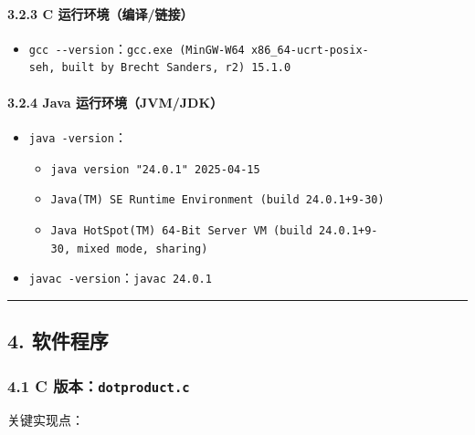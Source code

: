 \documentclass[12pt,fontset=none]{ctexart}
\providecommand{\tightlist}{%
  \setlength{\itemsep}{0pt}\setlength{\parskip}{0pt}}
\begin{document}
\paragraph{3.2.3 C
运行环境（编译/链接）}\label{323-c-ux8fd0ux884cux73afux5883ux7f16ux8bd1ux94feux63a5}

\begin{itemize}
\tightlist
\item
  \texttt{gcc\ -\/-version}：\texttt{gcc.exe\ (MinGW-W64\ x86\_64-ucrt-posix-seh,\ built\ by\ Brecht\ Sanders,\ r2)\ 15.1.0}
\end{itemize}

\paragraph{3.2.4 Java
运行环境（JVM/JDK）}\label{324-java-ux8fd0ux884cux73afux5883jvmjdk}

\begin{itemize}
\tightlist
\item
  \texttt{java\ -version}：

  \begin{itemize}
  \tightlist
  \item
    \texttt{java\ version\ "24.0.1"\ 2025-04-15}
  \item
    \texttt{Java(TM)\ SE\ Runtime\ Environment\ (build\ 24.0.1+9-30)}
  \item
    \texttt{Java\ HotSpot(TM)\ 64-Bit\ Server\ VM\ (build\ 24.0.1+9-30,\ mixed\ mode,\ sharing)}
  \end{itemize}
\item
  \texttt{javac\ -version}：\texttt{javac\ 24.0.1}
\end{itemize}

\begin{center}\rule{0.5\linewidth}{0.5pt}\end{center}

\subsection{4. 软件程序}\label{4-ux8f6fux4ef6ux7a0bux5e8f}

\subsubsection{\texorpdfstring{4.1 C
版本：\texttt{dotproduct.c}}{4.1 C 版本：dotproduct.c}}\label{41-c-ux7248ux672cdotproductc}

关键实现点：
\end{document}
